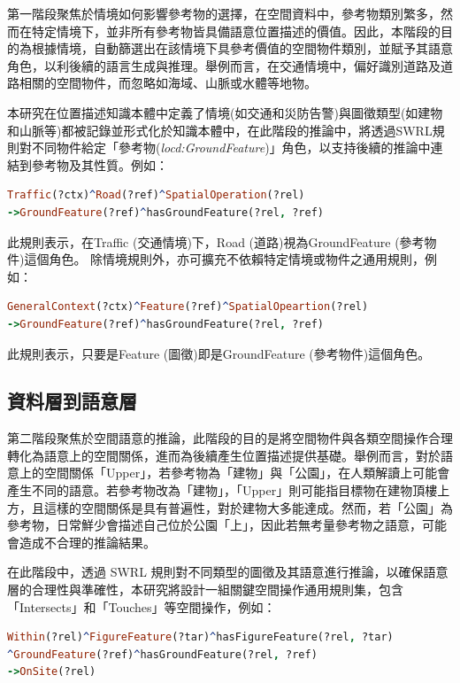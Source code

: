 第一階段聚焦於情境如何影響參考物的選擇，在空間資料中，參考物類別繁多，然而在特定情境下，並非所有參考物皆具備語意位置描述的價值。因此，本階段的目的為根據情境，自動篩選出在該情境下具參考價值的空間物件類別，並賦予其語意角色，以利後續的語言生成與推理。舉例而言，在交通情境中，偏好識別道路及道路相關的空間物件，而忽略如海域、山脈或水體等地物。

本研究在位置描述知識本體中定義了情境(如交通和災防告警)與圖徵類型(如建物和山脈等)都被記錄並形式化於知識本體中，在此階段的推論中，將透過SWRL規則對不同物件給定「參考物(\textit{locd:GroundFeature})」角色，以支持後續的推論中連結到參考物及其性質。例如：

\begin{lstlisting}[language=Prolog, basicstyle=\ttfamily, xleftmargin=2em]
Traffic(?ctx)^Road(?ref)^SpatialOperation(?rel) 
->GroundFeature(?ref)^hasGroundFeature(?rel, ?ref)
\end{lstlisting}

此規則表示，在Traffic (交通情境)下，Road (道路)視為GroundFeature (參考物件)這個角色。
除情境規則外，亦可擴充不依賴特定情境或物件之通用規則，例如：

\begin{lstlisting}[language=Prolog, basicstyle=\ttfamily, xleftmargin=2em]
GeneralContext(?ctx)^Feature(?ref)^SpatialOpeartion(?rel)
->GroundFeature(?ref)^hasGroundFeature(?rel, ?ref)
\end{lstlisting}

此規則表示，只要是Feature (圖徵)即是GroundFeature (參考物件)這個角色。

\subsection{資料層到語意層}

第二階段聚焦於空間語意的推論，此階段的目的是將空間物件與各類空間操作合理轉化為語意上的空間關係，進而為後續產生位置描述提供基礎。舉例而言，對於語意上的空間關係「Upper」，若參考物為「建物」與「公園」，在人類解讀上可能會產生不同的語意。若參考物改為「建物」，「Upper」則可能指目標物在建物頂樓上方，且這樣的空間關係是具有普遍性，對於建物大多能達成。然而，若「公園」為參考物，日常鮮少會描述自己位於公園「上」，因此若無考量參考物之語意，可能會造成不合理的推論結果。

在此階段中，透過 SWRL 規則對不同類型的圖徵及其語意進行推論，以確保語意層的合理性與準確性，本研究將設計一組關鍵空間操作通用規則集，包含「Intersects」和「Touches」等空間操作，例如：

\begin{lstlisting}[language=Prolog, basicstyle=\ttfamily, xleftmargin=2em]
Within(?rel)^FigureFeature(?tar)^hasFigureFeature(?rel, ?tar)
^GroundFeature(?ref)^hasGroundFeature(?rel, ?ref)
->OnSite(?rel)
\end{lstlisting}

